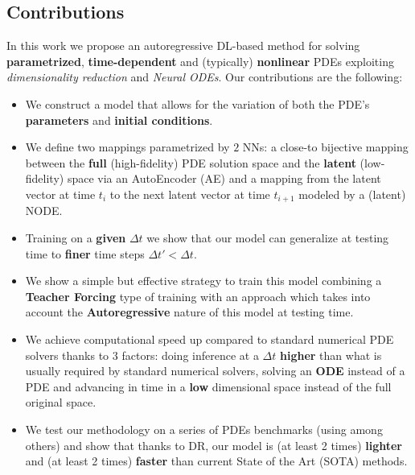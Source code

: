 \subsection{Contributions}
In this work we propose an autoregressive DL-based method for solving \textbf{parametrized}, \textbf{time-dependent} and (typically) \textbf{nonlinear} PDEs exploiting \textit{dimensionality reduction} and \textit{Neural ODEs}. Our contributions are the following:
\begin{itemize}
    \item We construct a model that allows for the variation of both the PDE's \textbf{parameters} and \textbf{initial conditions}. 
    \item We define two mappings parametrized by $2$ NNs: a close-to bijective mapping between the \textbf{full} (high-fidelity) PDE solution space and the \textbf{latent} (low-fidelity) space via an AutoEncoder (AE) and a mapping from the latent vector at time $t_i$ to the next latent vector at time $t_{i+1}$ modeled by a (latent) NODE. 
    \item Training on a \textbf{given} $\Delta t$ we show that our model can generalize at testing time to \textbf{finer} time steps $\Delta t'<\Delta t$. %
    \item We show a simple but effective strategy to train this model combining a \textbf{Teacher Forcing} type of training with an approach which takes into account the \textbf{Autoregressive} nature of this model at testing time. 
    \item We achieve computational speed up compared to standard numerical PDE solvers thanks to $3$ factors: doing inference at a $\Delta t$ \textbf{higher} than what is usually required by standard numerical solvers, solving an \textbf{ODE} instead of a PDE and advancing in time in a \textbf{low} dimensional space instead of the full original space.
    \item We test our methodology on a series of PDEs benchmarks (using \cite{takamoto2022pdebench} among others) and show that thanks to DR, our model is (at least 2 times) \textbf{lighter} and (at least 2 times) \textbf{faster} than current State of the Art (SOTA) methods.
\end{itemize}
 